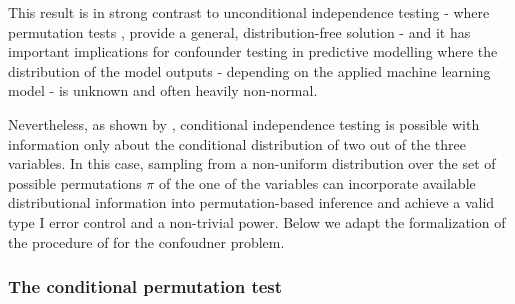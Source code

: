 \documentclass{article}
\begin{document}
This result is in strong contrast to unconditional independence testing - where permutation tests  \citep{pitman1937significance, fisher1942189}, provide a general, distribution-free solution - and it has important implications for confounder testing in predictive modelling where the distribution of the model outputs - depending on the applied machine learning model - is unknown and often heavily non-normal.

Nevertheless, as shown by \cite{berrett2020conditional}, conditional independence testing is possible with information only about the conditional distribution of two out of the three variables.
In this case, sampling from a non-uniform distribution over the set of possible permutations $\pi$ of the one of the variables can incorporate available distributional information into permutation-based inference and achieve a valid type I error control and a non-trivial power.
Below we adapt the formalization of the procedure of \cite{berrett2020conditional} for the confoudner problem.

\subsubsection*{The conditional permutation test}
\end{document}
